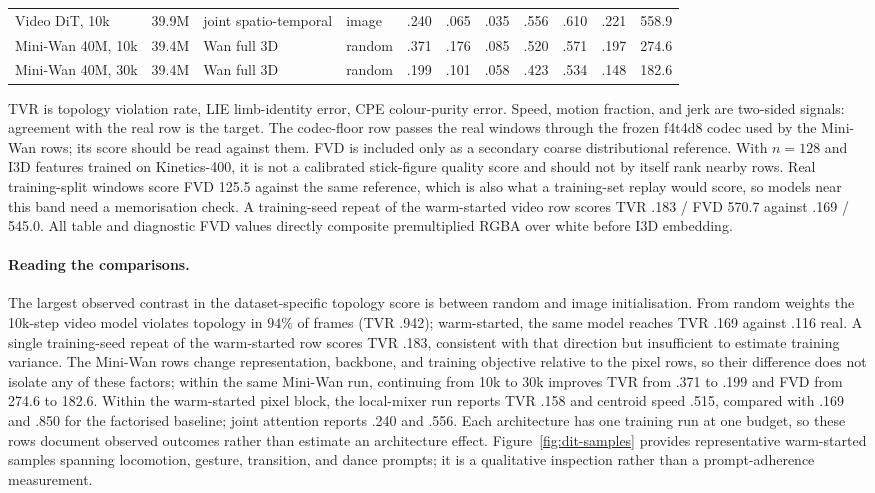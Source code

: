 \documentclass[10pt,twocolumn]{article}
\begin{document}
\begin{table}[t]
\begin{tabular}{@{}lcllrrrrrrr@{}}
Video DiT, 10k & 39.9M & joint spatio-temporal & image & .240 & .065 & .035 & .556 & .610 & .221 & 558.9 \\
Mini-Wan 40M, 10k & 39.4M & Wan full 3D & random & .371 & .176 & .085 & .520 & .571 & .197 & 274.6 \\
Mini-Wan 40M, 30k & 39.4M & Wan full 3D & random & .199 & .101 & .058 & .423 & .534 & .148 & 182.6 \\\bottomrule
\end{tabular}
\par\vspace{2pt}\raggedright\scriptsize TVR is topology violation rate, LIE limb-identity error, CPE
colour-purity error. Speed, motion fraction, and jerk are two-sided signals: agreement with the real row is the
target. The codec-floor row passes the real windows through the frozen f4t4d8 codec used by the Mini-Wan
rows; its score should be read against them. FVD is included only as a secondary coarse distributional reference.
With $n=128$ and I3D features trained on Kinetics-400, it is not a calibrated stick-figure quality score and
should not by itself rank nearby rows. Real training-split windows score FVD 125.5 against the same
reference, which is also what a training-set replay would score, so models near this band need a memorisation
check. A training-seed repeat of the warm-started video row scores TVR .183 / FVD 570.7 against .169 / 545.0.
All table and diagnostic FVD values directly composite premultiplied RGBA over white before I3D embedding.
\end{table}

\paragraph{Reading the comparisons.} The largest observed contrast in the dataset-specific topology score is
between random and image initialisation. From random weights the 10k-step video model violates topology in
$94\%$ of frames (TVR .942); warm-started, the same model reaches TVR .169 against .116 real. A single
training-seed repeat of the warm-started row scores TVR .183, consistent with that direction but
insufficient to estimate training variance. The Mini-Wan rows change representation, backbone, and training
objective relative to the pixel rows, so their difference does not isolate any of these factors; within the same Mini-Wan run,
continuing from 10k to 30k improves TVR from .371 to .199 and FVD from 274.6 to 182.6. Within the warm-started
pixel block, the local-mixer run reports TVR .158 and centroid speed .515, compared with .169 and .850 for the
factorised baseline; joint attention reports .240 and .556. Each architecture has one training run at one
budget, so these rows document observed outcomes rather than estimate an architecture effect.
Figure~\ref{fig:dit-samples} provides representative warm-started samples spanning locomotion, gesture,
transition, and dance prompts; it is a qualitative inspection rather than a prompt-adherence measurement.
\end{document}

